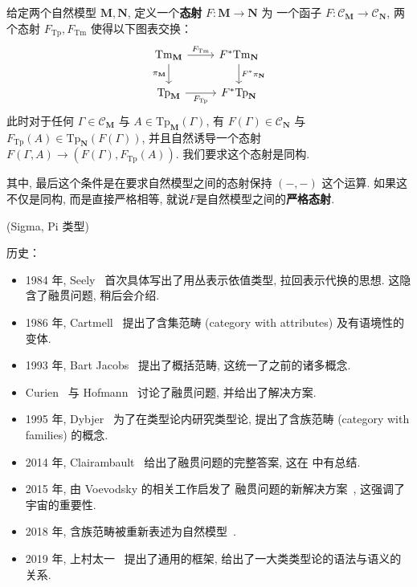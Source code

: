 \begin{definition}
给定两个自然模型 \(\mathbf M, \mathbf N\),
定义一个\textbf{态射} \(F : \mathbf M \to \mathbf N\) 为
一个函子 \(F : \mathcal C_{\mathbf M} \to \mathcal C_{\mathbf N}\),
两个态射 \(F_{\mathrm{Tp}} , F_{\mathrm{Tm}}\) 使得以下图表交换：
\[\begin{tikzcd}
  {\mathrm{Tm}_{\mathbf M}} & {F^*\mathrm{Tm}_{\mathbf N}} \\
  {\mathrm{Tp}_{\mathbf M}} & {F^*\mathrm{Tp}_{\mathbf N}}
  \arrow["{F_{\mathrm{Tp}}}"', from=2-1, to=2-2]
  \arrow["{F_{\mathrm{Tm}}}", from=1-1, to=1-2]
  \arrow["{\pi_{\mathbf M}}"', from=1-1, to=2-1]
  \arrow["{F^* \pi_{\mathbf N}}", from=1-2, to=2-2]
\end{tikzcd}\]
此时对于任何 \(\Gamma \in \mathcal C_{\mathbf M}\) 与
\(A \in \mathrm{Tp}_{\mathbf M}(\Gamma)\), 有
\(F(\Gamma) \in \mathcal C_{\mathbf N}\) 与
\(F_{\mathrm{Tp}}(A) \in \mathrm{Tp}_{\mathbf N}(F(\Gamma))\),
并且自然诱导一个态射 \(F(\Gamma, A) \to (F(\Gamma), F_{\mathrm{Tp}}(A))\).
我们要求这个态射是同构.
\end{definition}

其中, 最后这个条件是在要求自然模型之间的态射保持 \((-,-)\) 这个运算.
如果这不仅是同构, 而是直接严格相等, 就说\(F\)是自然模型之间的\textbf{严格态射}.

(Sigma, Pi 类型)

历史：
\begin{itemize}
\item 1984 年, Seely~\cite{seely:1984:lccc}
首次具体写出了用丛表示依值类型, 拉回表示代换的思想.
这隐含了融贯问题, 稍后会介绍.
\item 1986 年, Cartmell~\cite{cartmell:1986:contextualcat}
提出了含集范畴 (category with attributes) 及有语境性的变体.
\item 1993 年, Bart Jacobs~\cite{jacobs:1993:comprehensioncat}
提出了概括范畴, 这统一了之前的诸多概念.
\item Curien~\cite{curien:1993:coherence} 与 Hofmann~\cite{hofmann:1995:lccccoh}
讨论了融贯问题, 并给出了解决方案.
\item 1995 年, Dybjer~\cite{dybjer:1995:internal}
为了在类型论内研究类型论, 提出了含族范畴 (category with families) 的概念.
\item 2014 年, Clairambault~\cite{clairambault:2014:biequivalence}
给出了融贯问题的完整答案, 这在 \cite{curien:2014:revisit} 中有总结.
\item 2015 年, 由 Voevodsky 的相关工作启发了
融贯问题的新解决方案~\cite{lumsdaine:2015:universes}, 这强调了宇宙的重要性.
\item 2018 年, 含族范畴被重新表述为自然模型~\cite{awodey:2018:natural}.
\item 2019 年, 上村太一~\cite{uemura:2019:general}
提出了通用的框架, 给出了一大类类型论的语法与语义的关系.
\end{itemize}

